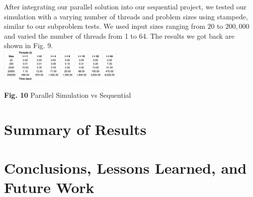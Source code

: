 \documentclass[conference]{IEEEtran}
\begin{document}
\hspace*{.2cm} After integrating our parallel solution into our sequential project, we tested our simulation with a varying number of threads and problem sizes using stampede, similar to our subproblem tests. We used input sizes ranging from $20$ to $200,000$ and varied the number of threads from 1 to 64. The results we got back are shown in Fig. 9. \\

\includegraphics[width=0.45\textwidth]{results}
\begin{center}
	\textbf{Fig. 10} Parallel Simulation vs Sequential \\
\end{center}

\section{Summary of Results}
\lipsum[4]

\section{Conclusions, Lessons Learned, and Future Work}
\lipsum[5]



\end{document}
